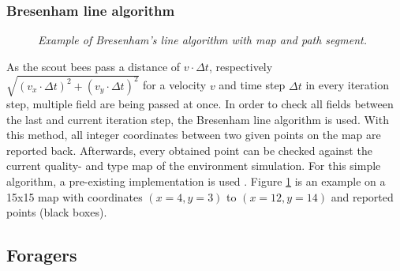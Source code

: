 	\subsubsection{Bresenham line algorithm}
		\begin{figure}
			\centering
			\caption{\textit{Example of Bresenham's line algorithm with map and path segment.}}
			\label{fig:bresenham}
		\end{figure}
		As the scout bees pass a distance of $v \cdot \Delta t$, respectively $\sqrt{(v_x \cdot \Delta t)^2 + (v_y \cdot \Delta t)^2}$ for a velocity $v$ and time step $\Delta t$ in every iteration step, multiple field are being passed at once. In order to check all fields between the last and current iteration step, the Bresenham line algorithm is used. With this method, all integer coordinates between two given points on the map are reported back. Afterwards, every obtained point can be checked against the current quality- and type map of the environment simulation.
		For this simple algorithm, a pre-existing implementation is used \cite{MVTB}. Figure \ref{fig:bresenham} is an example on a 15x15 map with coordinates $(x = 4, y = 3)$ to $(x = 12, y = 14)$ and reported points (black boxes).
\subsection{Foragers}
